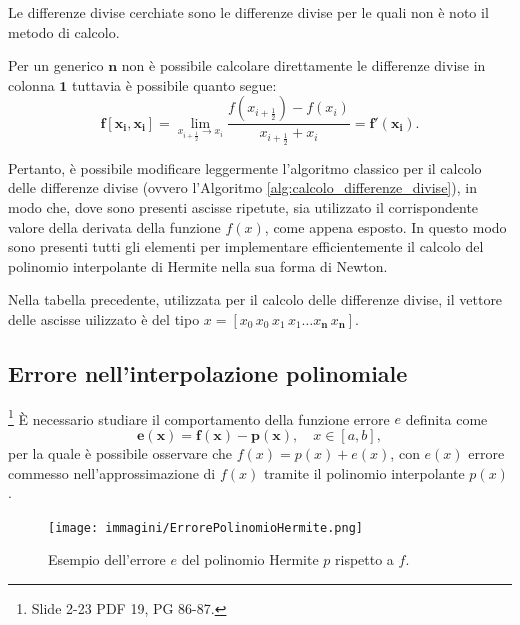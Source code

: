 \begin{example}
    Le differenze divise cerchiate sono le differenze divise per le quali non è noto il metodo di calcolo. 
    
    Per un generico $\boldsymbol n$ non è possibile calcolare direttamente le differenze divise in colonna $\boldsymbol{1}$  tuttavia è possibile quanto segue:
    \begin{equation*}
        \boldsymbol{f[x_i,x_i]}=\lim_{x_{i+\frac{1}{2}}\to x_i}\frac{f\left(x_{i+\frac{1}{2}}\right)-f(x_i)}{x_{i+\frac{1}{2}}+x_i}=\boldsymbol{f'(x_i)}.
    \end{equation*}
\end{example}

Pertanto, è possibile modificare leggermente l'algoritmo classico per il calcolo delle differenze divise (ovvero l'Algoritmo \ref{alg:calcolo_differenze_divise}), in modo che, dove sono presenti ascisse ripetute, sia utilizzato il corrispondente valore della derivata della funzione $f(x)$, come appena esposto. In questo modo sono presenti tutti gli elementi per implementare efficientemente il calcolo del polinomio interpolante di Hermite nella sua forma di Newton.

\begin{remark}
    Nella tabella precedente, utilizzata per il calcolo delle differenze divise, il vettore delle ascisse uilizzato è del tipo $x=[x_0\, x_0\, x_1\, x_1 \hdots x_{\boldsymbol n}\, x_{\boldsymbol n}].$
\end{remark}

\subsection{Errore nell'interpolazione polinomiale}\label{ssec:errore_interpolazione_polinomiale}\footnote{Slide 2-23 PDF 19, PG 86-87.}
È necessario studiare il comportamento della funzione errore $e$ definita come
\begin{equation}\label{eq:defErrInter}
    \boldsymbol{e(x)=f(x)-p(x)},\quad x\in [a,b],
\end{equation}
per la quale è possibile osservare che $f(x)=p(x)+e(x)$, con $e(x)$ errore commesso nell'approssimazione di $f(x)$ tramite il polinomio interpolante $p(x)$.

\begin{figure}
    \centering
    \texttt{[image: immagini/ErrorePolinomioHermite.png]}
    \caption{Esempio dell'errore $e$ del polinomio Hermite $p$ rispetto a $f$.}
    \label{fig:errore_polinomio_hermite}
\end{figure}
 
